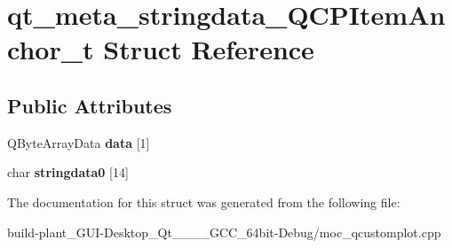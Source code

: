 \hypertarget{structqt__meta__stringdata__QCPItemAnchor__t}{}\section{qt\+\_\+meta\+\_\+stringdata\+\_\+\+Q\+C\+P\+Item\+Anchor\+\_\+t Struct Reference}
\label{structqt__meta__stringdata__QCPItemAnchor__t}
\subsection*{Public Attributes}
\begin{DoxyCompactItemize}
\item 
\mbox{\label{structqt__meta__stringdata__QCPItemAnchor__t_ab593c041f966a8f093e032b5b552399d}} 
Q\+Byte\+Array\+Data {\bfseries data} \mbox{[}1\mbox{]}
\item 
\mbox{\label{structqt__meta__stringdata__QCPItemAnchor__t_aafbba7dee657bf2d44a9148e9e2c6b48}} 
char {\bfseries stringdata0} \mbox{[}14\mbox{]}
\end{DoxyCompactItemize}


The documentation for this struct was generated from the following file\+:\begin{DoxyCompactItemize}
\item 
build-\/plant\+\_\+\+G\+U\+I-\/\+Desktop\+\_\+\+Qt\+\_\+\_\+\_\+\_\+\+G\+C\+C\+\_\+64bit-\/\+Debug/moc\+\_\+qcustomplot.\+cpp\end{DoxyCompactItemize}
